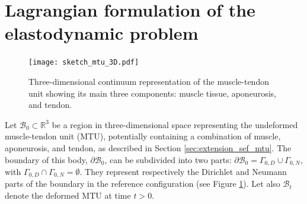 \documentclass{sfuthesis}
\numberwithin{equation}{section}
\numberwithin{figure}{chapter}
\numberwithin{table}{chapter}
\theoremstyle{definition}
\newcommand{\R}{\mathbb{R}}
\newcommand{\B}{\mathcal{B}}
\begin{document}



\section{Lagrangian formulation of the elastodynamic problem}

\begin{figure}
    \centering
    \texttt{[image: sketch\_mtu\_3D.pdf]}
    \caption{Three-dimensional continuum representation of the muscle-tendon unit showing its main three components: muscle tissue, aponeurosis, and tendon.
    \label{fig:continuum_mtu}}
\end{figure}

Let $\B_0 \subset \R^3$ be a region in three-dimensional space representing the undeformed muscle-tendon unit (MTU), potentially containing a combination of muscle, aponeurosis, and tendon, as described in Section \ref{sec:extension_sef_mtu}. The boundary of this body, $\partial \B_0$, can be subdivided into two parts: $\partial \B_0 = \Gamma_{0,D} \cup \Gamma_{0,N}$, with $\Gamma_{0,D} \cap \Gamma_{0,N} = \emptyset$. They represent respectively the Dirichlet and Neumann parts of the boundary in the reference configuration (see Figure \ref{fig:continuum_mtu}). Let also $\B_t$ denote the deformed MTU at time $t > 0$.
\end{document}
